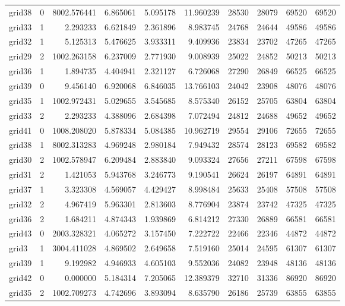 \begin{longtable}{|l|r|r|r|r|r|r|r|r|r|}
grid38 & 0 & 8002.576441 & 6.865061 & 5.095178 & 11.960239 & 28530 & 28079 & 69520 & 69520 \\
grid33 & 1 & 2.293233 & 6.621849 & 2.361896 & 8.983745 & 24768 & 24644 & 49586 & 49586 \\
grid32 & 1 & 5.125313 & 5.476625 & 3.933311 & 9.409936 & 23834 & 23702 & 47265 & 47265 \\
grid29 & 2 & 1002.263158 & 6.237009 & 2.771930 & 9.008939 & 25022 & 24852 & 50213 & 50213 \\
grid36 & 1 & 1.894735 & 4.404941 & 2.321127 & 6.726068 & 27290 & 26849 & 66525 & 66525 \\
grid39 & 0 & 9.456140 & 6.920068 & 6.846035 & 13.766103 & 24042 & 23908 & 48076 & 48076 \\
grid35 & 1 & 1002.972431 & 5.029655 & 3.545685 & 8.575340 & 26152 & 25705 & 63804 & 63804 \\
grid33 & 2 & 2.293233 & 4.388096 & 2.684398 & 7.072494 & 24812 & 24688 & 49652 & 49652 \\
grid41 & 0 & 1008.208020 & 5.878334 & 5.084385 & 10.962719 & 29554 & 29106 & 72655 & 72655 \\
grid38 & 1 & 8002.313283 & 4.969248 & 2.980184 & 7.949432 & 28574 & 28123 & 69582 & 69582 \\
grid30 & 2 & 1002.578947 & 6.209484 & 2.883840 & 9.093324 & 27656 & 27211 & 67598 & 67598 \\
grid31 & 2 & 1.421053 & 5.943768 & 3.246773 & 9.190541 & 26624 & 26197 & 64891 & 64891 \\
grid37 & 1 & 3.323308 & 4.569057 & 4.429427 & 8.998484 & 25633 & 25408 & 57508 & 57508 \\
grid32 & 2 & 4.967419 & 5.963301 & 2.813603 & 8.776904 & 23874 & 23742 & 47325 & 47325 \\
grid36 & 2 & 1.684211 & 4.874343 & 1.939869 & 6.814212 & 27330 & 26889 & 66581 & 66581 \\
grid43 & 0 & 2003.328321 & 4.065272 & 3.157450 & 7.222722 & 22466 & 22346 & 44872 & 44872 \\
grid3 & 1 & 3004.411028 & 4.869502 & 2.649658 & 7.519160 & 25014 & 24595 & 61307 & 61307 \\
grid39 & 1 & 9.192982 & 4.946933 & 4.605103 & 9.552036 & 24082 & 23948 & 48136 & 48136 \\
grid42 & 0 & 0.000000 & 5.184314 & 7.205065 & 12.389379 & 32710 & 31336 & 86920 & 86920 \\
grid35 & 2 & 1002.709273 & 4.742696 & 3.893094 & 8.635790 & 26186 & 25739 & 63855 & 63855 \\

\end{longtable}
